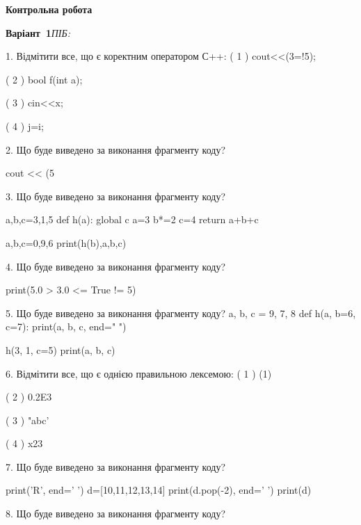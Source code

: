 \documentclass[11pt]{article}
\begin{document}
{\large\textbf{Контрольна робота}}

\textbf{Варіант \No\,1}\hfill \textit{ПІБ:}\,\underline{\hspace{60mm}}
\vspace{4mm}

1. %
Відмітити все, що є коректним оператором С++:
( 1 ) cout<<(3=!5);

( 2 ) bool f(int a);

( 3 ) cin<<x;

( 4 ) j=i;
\vspace{5mm}

2. Що буде виведено за виконання фрагменту коду?

cout << (5 %
\vspace{5mm}

3. Що буде виведено за виконання фрагменту коду?

a,b,c=3,1,5
def h(a):
global c    a=3
    b*=2
    c=4
    return a+b+c

a,b,c=0,9,6
print(h(b),a,b,c)
\vspace{5mm}

4. Що буде виведено за виконання фрагменту коду?

print(5.0 > 3.0 <= True != 5)
\vspace{5mm}

5. Що буде виведено за виконання фрагменту коду?
a, b, c = 9, 7, 8
def h(a, b=6, c=7):
    print(a, b, c, end=" ")

h(3, 1, c=5)
print(a, b, c)
\vspace{5mm}

6. %
Відмітити все, що є однією правильною лексемою:
( 1 ) (1)

( 2 ) 0.2E3

( 3 ) "abc'

( 4 ) x23
\vspace{5mm}

7. Що буде виведено за виконання фрагменту коду?

print('R', end=' ')
d=[10,11,12,13,14]
print(d.pop(-2), end=' ')
print(d)

\vspace{5mm}

8. Що буде виведено за виконання фрагменту коду?
\end{document}

